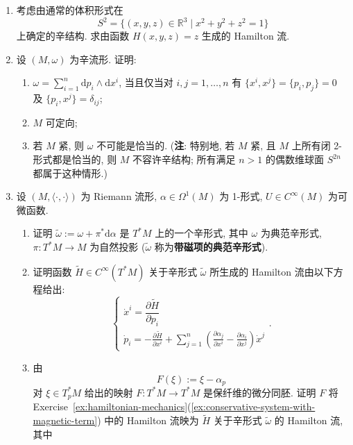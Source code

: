 \begin{RiemannExercise}\label{ex:symmetry-and-reduction}
\begin{enumerate}[label=(\arabic*),ref=\arabic*,leftmargin=*]
\item\label{ex:height-hamiltonian-on-sphere}
考虑由通常的体积形式在
\[
  S^2=\{(x,y,z)\in\mathbb{R}^3\mid x^2+y^2+z^2=1\}
\]
上确定的辛结构. 求由函数 $H(x,y,z)=z$ 生成的 Hamilton 流.
\item\label{ex:canonical-brackets-and-symplectic-coordinates}
设 $(M,\omega)$ 为辛流形. 证明:
\begin{enumerate}[label=(\alph*),leftmargin=*]
\item $\omega=\sum_{i=1}^n\mathrm{d}p_i\wedge\mathrm{d}x^i$, 当且仅当对 $i,j=1,\ldots,n$ 有 $\{x^i,x^j\}=\{p_i,p_j\}=0$ 及 $\{p_i,x^j\}=\delta_{ij}$;
\item $M$ 可定向;
\item 若 $M$ 紧, 则 $\omega$ 不可能是恰当的. (\textbf{注}: 特别地, 若 $M$ 紧, 且 $M$ 上所有闭 2-形式都是恰当的, 则 $M$ 不容许辛结构; 所有满足 $n>1$ 的偶数维球面 $S^{2n}$ 都属于这种情形.)
\end{enumerate}
\item\label{ex:magnetic-term-in-symplectic-form}
设 $(M,\langle\cdot,\cdot\rangle)$ 为 Riemann 流形, $\alpha\in\Omega^1(M)$ 为 1-形式, $U\in C^\infty(M)$ 为可微函数.
\begin{enumerate}[label=(\alph*),leftmargin=*]
\item 证明 $\widetilde\omega:=\omega+\pi^*\mathrm{d}\alpha$ 是 $T^*M$ 上的一个辛形式, 其中 $\omega$ 为典范辛形式, $\pi:T^*M\to M$ 为自然投影 ($\widetilde\omega$ 称为\textbf{带磁项的典范辛形式}).
\item 证明函数 $\widetilde H\in C^\infty(T^*M)$ 关于辛形式 $\widetilde\omega$ 所生成的 Hamilton 流由以下方程给出:
\[
  \begin{cases}
    \dot x^i=\dfrac{\partial\widetilde H}{\partial p_i}\\[.7ex]
    \displaystyle\dot p_i=-\frac{\partial\widetilde H}{\partial x^i}
    +\sum_{j=1}^n\left(\frac{\partial\alpha_j}{\partial x^i}
                  -\frac{\partial\alpha_i}{\partial x^j}\right)\dot x^j
  \end{cases}.
\]
\item 由
\[
  F(\xi):=\xi-\alpha_p
\]
对 $\xi\in T_p^*M$ 给出的映射 $F:T^*M\to T^*M$ 是保纤维的微分同胚. 证明 $F$ 将 Exercise~\ref{ex:hamiltonian-mechanics}(\ref{ex:conservative-system-with-magnetic-term}) 中的 Hamilton 流映为 $\widetilde H$ 关于辛形式 $\widetilde\omega$ 的 Hamilton 流, 其中

\end{enumerate}
\end{enumerate}
\end{RiemannExercise}
